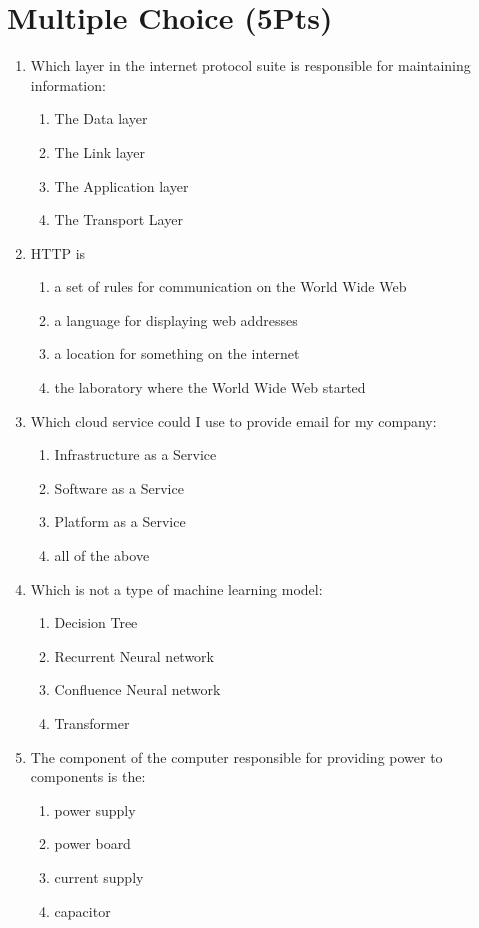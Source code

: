 \documentclass{article}
\begin{document}
\pagestyle{fancy}
\section{Multiple Choice (5Pts)}
\begin{enumerate}
    \item Which layer in the internet protocol suite is responsible for maintaining information:
    \begin{enumerate}
        \item The Data layer
        \item The Link layer
        \item The Application layer
        \item The Transport Layer
    \end{enumerate}
    \item HTTP is
    \begin{enumerate}
        \item a set of rules for communication on the World Wide Web
        \item a language for displaying web addresses
        \item a location for something on the internet
        \item the laboratory where the World Wide Web started
    \end{enumerate}
    \item Which cloud service could I use to provide email for my company:
    \begin{enumerate}
        \item Infrastructure as a Service
        \item Software as a Service
        \item Platform as a Service
        \item all of the above
    \end{enumerate}
    \item Which is not a type of machine learning model:
    \begin{enumerate}
        \item Decision Tree
        \item Recurrent Neural network
        \item Confluence Neural network
        \item Transformer
    \end{enumerate} 
    \item The component of the computer responsible for providing power to components is the:
    \begin{enumerate}
        \item power supply
        \item power board
        \item current supply
        \item capacitor
    \end{enumerate} 
\end{enumerate}
\end{document}
